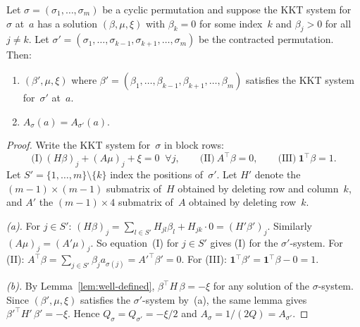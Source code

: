 
\begin{unverified}
\begin{lemma}%
\label{lem:orbit-contraction}
Let $\sigma = (\sigma_1, \ldots, \sigma_m)$ be a cyclic permutation
and suppose the KKT system for~$\sigma$ at~$a$ has a solution
$(\beta, \mu, \xi)$ with $\beta_k = 0$ for some index~$k$
and $\beta_j > 0$ for all $j \neq k$.
Let $\sigma' = (\sigma_1, \ldots, \sigma_{k-1}, \sigma_{k+1}, \ldots, \sigma_m)$
be the contracted permutation.
Then:
\begin{enumerate}
\item[\textup{(a)}]
  $(\beta', \mu, \xi)$ where $\beta' = (\beta_1, \ldots, \beta_{k-1},
  \beta_{k+1}, \ldots, \beta_m)$ satisfies the KKT system for~$\sigma'$ at~$a$.
\item[\textup{(b)}]
  $A_\sigma(a) = A_{\sigma'}(a)$.
\end{enumerate}
\end{lemma}

\begin{proof}
Write the KKT system for~$\sigma$ in block rows:
\[
  \text{(I)}\ (H\beta)_j + (A\mu)_j + \xi = 0 \;\; \forall j, \qquad
  \text{(II)}\ A^\top \beta = 0, \qquad
  \text{(III)}\ \mathbf{1}^\top \beta = 1.
\]
Let $S' = \{1,\ldots,m\} \setminus \{k\}$ index the positions
of~$\sigma'$.
Let $H'$ denote the $(m{-}1) \times (m{-}1)$ submatrix of~$H$
obtained by deleting row and column~$k$,
and $A'$ the $(m{-}1) \times 4$ submatrix of~$A$
obtained by deleting row~$k$.

\emph{(a).}
For $j \in S'$:
$(H\beta)_j = \sum_{l \in S'} H_{jl} \beta_l + H_{jk} \cdot 0
= (H'\beta')_j$.
Similarly $(A\mu)_j = (A'\mu)_j$.
So equation~(I) for $j \in S'$ gives (I) for the $\sigma'$-system.
For (II): $A^\top \beta = \sum_{j \in S'} \beta_j a_{\sigma(j)} = {A'}^\top \beta' = 0$.
For (III): $\mathbf{1}^\top \beta' = \mathbf{1}^\top \beta - 0 = 1$.

\emph{(b).}
By Lemma~\ref{lem:well-defined},
$\beta^\top H\,\beta = -\xi$ for any solution of the
$\sigma$-system. Since $(\beta', \mu, \xi)$ satisfies
the $\sigma'$-system by~(a), the same lemma gives
${\beta'}^\top H'\,\beta' = -\xi$.
Hence $Q_\sigma = Q_{\sigma'} = -\xi/2$ and
$A_\sigma = 1/(2Q) = A_{\sigma'}$.
\end{proof}
\end{unverified}



